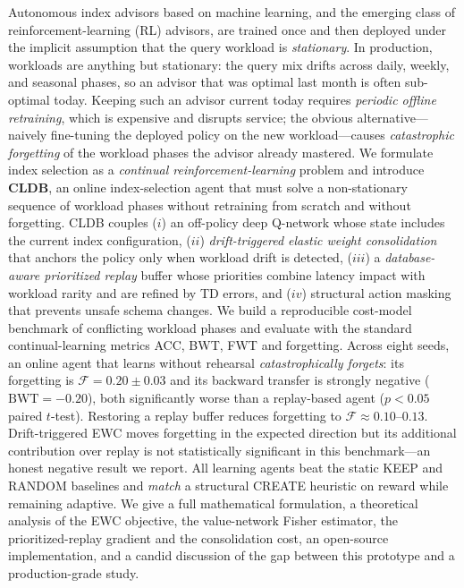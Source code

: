 Autonomous index advisors based on machine learning, and the emerging class of
reinforcement-learning (RL) advisors, are trained once and then deployed under
the implicit assumption that the query workload is \emph{stationary}. In
production, workloads are anything but stationary: the query mix drifts across
daily, weekly, and seasonal phases, so an advisor that was optimal last month is
often sub-optimal today. Keeping such an advisor current today requires
\emph{periodic offline retraining}, which is expensive and disrupts service; the
obvious alternative---naively fine-tuning the deployed policy on the new
workload---causes \emph{catastrophic forgetting} of the workload phases the
advisor already mastered. We formulate index selection as a \emph{continual
reinforcement-learning} problem and introduce \textbf{CLDB}, an online
index-selection agent that must solve a non-stationary sequence of workload
phases without retraining from scratch and without forgetting. CLDB couples
(\(i\)) an off-policy deep Q-network whose state includes the current
index configuration, (\(ii\)) \emph{drift-triggered elastic weight
consolidation} that anchors the policy only when workload drift is detected,
(\(iii\)) a \emph{database-aware prioritized replay} buffer whose priorities
combine latency impact with workload rarity and are refined by TD errors, and
(\(iv\)) structural action masking that prevents unsafe schema changes. We build
a reproducible cost-model benchmark of conflicting workload phases and evaluate
with the standard continual-learning metrics ACC, BWT, FWT and forgetting. Across
eight seeds, an online agent that learns without rehearsal \emph{catastrophically
forgets}: its forgetting is \(\mathcal{F}=0.20\pm0.03\) and its backward transfer
is strongly negative (\(\mathrm{BWT}=-0.20\)), both significantly worse than a
replay-based agent ($p<0.05$ paired $t$-test). Restoring a replay buffer reduces
forgetting to \(\mathcal{F}\approx0.10\text{--}0.13\). Drift-triggered EWC moves
forgetting in the expected direction but its additional contribution over replay
is not statistically significant in this benchmark---an honest negative result we
report. All learning agents beat the static KEEP and RANDOM baselines and
\emph{match} a structural CREATE heuristic on reward while remaining adaptive. We
give a full mathematical formulation, a theoretical analysis of the EWC
objective, the value-network Fisher estimator, the prioritized-replay gradient
and the consolidation cost, an open-source implementation, and a candid discussion
of the gap between this prototype and a production-grade study.
